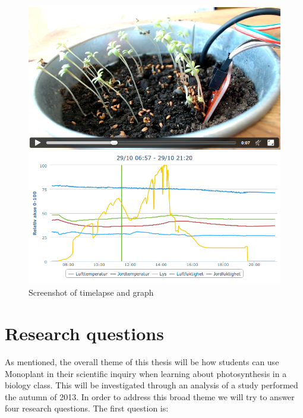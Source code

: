 \begin{figure}
	\centering
	\includegraphics[width=\textwidth]{img/introduction/graphlapse.png}
	\caption{Screenshot of timelapse and graph}
	\label{fig:scrshotgraphlapse}
\end{figure}


\section{Research questions}
As mentioned, the overall theme of this thesis will be how students can use Monoplant in their scientific inquiry when learning about photosynthesis in a biology class. This will be investigated through an analysis of a study performed the autumn of 2013. In order to address this broad theme we will try to answer four research questions. The first question is: 


